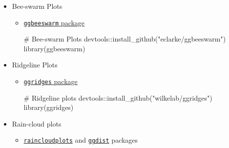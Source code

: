 \documentclass[
  letterpaper,
  DIV=11,
  numbers=noendperiod,
  oneside]{scrreprt}
\newenvironment{Shaded}{\begin{snugshade}}{\end{snugshade}}
\newcommand{\CommentTok}[1]{\textcolor[rgb]{0.37,0.37,0.37}{#1}}
\newcommand{\FunctionTok}[1]{\textcolor[rgb]{0.28,0.35,0.67}{#1}}
\newcommand{\NormalTok}[1]{\textcolor[rgb]{0.00,0.23,0.31}{#1}}
\newcommand{\SpecialCharTok}[1]{\textcolor[rgb]{0.37,0.37,0.37}{#1}}
\newcommand{\StringTok}[1]{\textcolor[rgb]{0.13,0.47,0.30}{#1}}
\begin{document}
\begin{itemize}
  \begin{itemize}
  \item
    \href{https://wilkox.org/treemapify/}{\texttt{treemapify} package}

\begin{Shaded}
\begin{Highlighting}[]
\CommentTok{\# Treemaps}
\NormalTok{devtools}\SpecialCharTok{::}\FunctionTok{install\_github}\NormalTok{(}\StringTok{"wilkox/treemapify"}\NormalTok{)}
\FunctionTok{library}\NormalTok{(treemapify)}
\end{Highlighting}
\end{Shaded}
  \end{itemize}
\item[$\boxtimes$]
  Bee-swarm Plots

  \begin{itemize}
  \item
    \href{https://github.com/eclarke/ggbeeswarm}{\texttt{ggbeeswarm}
    package}

\begin{Shaded}
\begin{Highlighting}[]
\CommentTok{\# Bee{-}swarm Plots}
\NormalTok{devtools}\SpecialCharTok{::}\FunctionTok{install\_github}\NormalTok{(}\StringTok{"eclarke/ggbeeswarm"}\NormalTok{)}
\FunctionTok{library}\NormalTok{(ggbeeswarm)}
\end{Highlighting}
\end{Shaded}
  \end{itemize}
\item[$\boxtimes$]
  Ridgeline Plots

  \begin{itemize}
  \item
    \href{https://wilkelab.org/ggridges/}{\texttt{ggridges} package}

\begin{Shaded}
\begin{Highlighting}[]
\CommentTok{\# Ridgeline plots }
\NormalTok{devtools}\SpecialCharTok{::}\FunctionTok{install\_github}\NormalTok{(}\StringTok{"wilkelab/ggridges"}\NormalTok{)}
\FunctionTok{library}\NormalTok{(ggridges)}
\end{Highlighting}
\end{Shaded}
  \end{itemize}
\item[$\boxtimes$]
  Rain-cloud plots

  \begin{itemize}
  \item
    \href{https://github.com/jorvlan/raincloudplots}{\texttt{raincloudplots}}
    and
    \href{https://mjskay.github.io/ggdist/reference/index.html}{\texttt{ggdist}}
    packages


\end{itemize}
\end{itemize}
\end{document}

